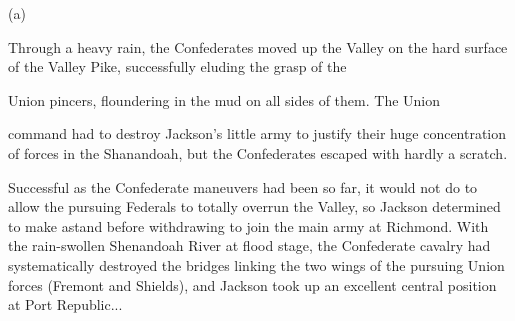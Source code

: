(a)

Through a heavy rain, the Confederates moved up the Valley on the hard surface of the Valley Pike, successfully eluding the grasp of the

\begin{scenariodata}
Union pincers, floundering in the mud on all sides of them. The Union\\
\end{scenariodata}

command had to destroy Jackson's little army to justify their huge concentration of forces in the Shanandoah, but the Confederates escaped with hardly a scratch.

Successful as the Confederate maneuvers had been so far, it would not do to allow the pursuing Federals to totally overrun the Valley, so Jackson determined to make astand before withdrawing to join the main army at Richmond. With the rain-swollen Shenandoah River at flood stage, the Confederate cavalry had systematically destroyed the bridges linking the two wings of the pursuing Union forces (Fremont and Shields), and Jackson took up an excellent central position at Port Republic...

